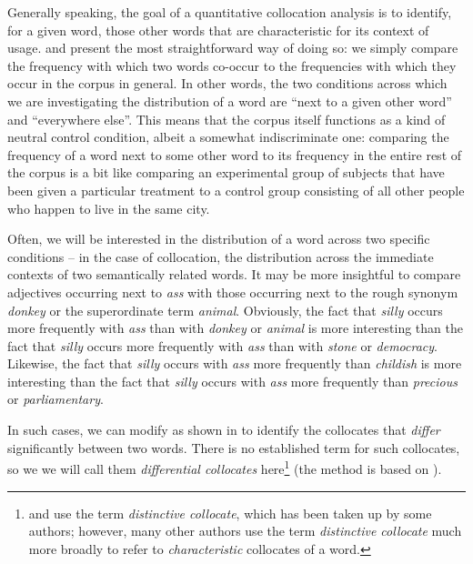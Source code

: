 Generally speaking, the goal of a quantitative  collocation  analysis is to identify, for a given word, those other words that are characteristic for its context of usage.  and  present the most straightforward way of doing so: we simply compare the frequency  with which two words co\hyp{}occur to the frequencies with which they occur in the corpus in general. In other words, the two conditions across which we are investigating the distribution  of a word are ``next to a given other word'' and ``everywhere else''. This means that the corpus itself functions as a kind of neutral control condition, albeit a somewhat indiscriminate one: comparing the frequency  of a word next to some other word to its frequency in the entire rest of the corpus is a bit like comparing an experimental  group of subjects that have been given a particular treatment to a control group consisting of all other people who happen to live in the same city.

Often, we will be interested in the distribution  of a word across two specific conditions -- in the case of collocation,  the distribution across the immediate contexts of two semantically  related words. It may be more insightful to compare adjectives  occurring next to \textit{ass} with those occurring next to the rough synonym  \textit{donkey} or the superordinate term \textit{animal}. Obviously, the fact that \textit{silly} occurs more frequently with \textit{ass} than with \textit{donkey} or \textit{animal} is more interesting than the fact that \textit{silly} occurs more frequently with \textit{ass} than with \textit{stone} or \textit{democracy}. Likewise, the fact that \textit{silly} occurs with \textit{ass} more frequently than \textit{childish} is more interesting than the fact that \textit{silly} occurs with \textit{ass} more frequently than \textit{precious} or \textit{parliamentary}.

In such cases, we can modify  as shown in  to identify the collocates  that \textit{differ} significantly  between two words. There is no established term for such collocates, so we we will call them \textit{differential collocates} here\footnote{\citet{gries_testing_2003} and \citet{gries_extending_2004} use the term \textit{distinctive collocate}, which has been taken up by some authors; however, many other authors use the term \textit{distinctive collocate}  much more broadly to refer to \textit{characteristic} collocates of a word.} (the method is based on \citet{church_using_1991}).

